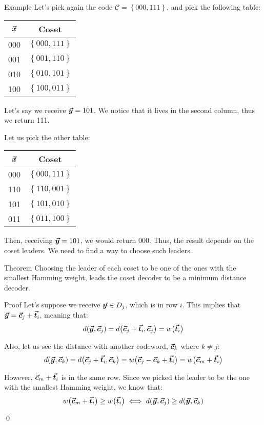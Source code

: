\documentclass[a4paper]{article}
\begin{document}
\begin{parag}{Example}
    Let's pick again the code $\mathcal{C} = \left\{000, 111\right\}$, and pick the following table:
    \begin{center}
    \begin{tabular}{c|c}
        $\bm{\protect\vec{x}}$ & Coset \\
        \hline
        000 & $\left\{000, 111\right\}$ \\
        001 & $\left\{001, 110\right\}$ \\
        010 & $\left\{010, 101\right\}$  \\
        100 & $\left\{100, 011\right\}$
    \end{tabular}
    \end{center}

    Let's say we receive $\bm{\protect\vec{y}} = 101$. We notice that it lives in the second column, thus we return 111.

    Let us pick the other table:
    \begin{center}
    \begin{tabular}{c|c}
        $\bm{\protect\vec{x}}$ & Coset \\
        \hline
        000 & $\left\{000, 111\right\}$  \\
        110 & $\left\{110, 001\right\}$ \\
        101 & $\left\{101, 010\right\}$  \\
        011 & $\left\{011, 100\right\}$
    \end{tabular}
    \end{center}

    Then, receiving $\bm{\protect\vec{y}} = 101$, we would return 000. Thus, the result depends on the coset leaders. We need to find a way to choose such leaders.
\end{parag}

\begin{parag}{Theorem}
    Choosing the leader of each coset to be one of the ones with the smallest Hamming weight, leads the coset decoder to be a minimum distance decoder. 

    \begin{subparag}{Proof}
        Let's suppose we receive $\bm{\protect\vec{y}} \in D_j$, which is in row $i$. This implies that $\bm{\protect\vec{y}} = \bm{\protect\vec{c}}_j + \bm{\protect\vec{t}}_i$, meaning that:
        \[d\left(\bvec{y}, \bvec{c}_j\right) = d\left(\bvec{c}_j + \bvec{t}_i, \bvec{c}_j\right) = w\left(\bvec{t}_i\right)\]

        Also, let us see the distance with another codeword, $\bm{\protect\vec{c}}_k$ where $k \neq j$: 
        \[d\left(\bvec{y}, \bvec{c}_k\right) = d\left(\bvec{c}_j + \bvec{t}_i, \bvec{c}_k\right) = w\left(\bvec{c}_j - \bvec{c}_k + \bvec{t}_i\right) = w\left(\bvec{c}_m + \bvec{t}_i\right)\]
        
        However, $\bm{\protect\vec{c}}_m + \bm{\protect\vec{t}}_i$ is in the same row. Since we picked the leader to be the one with the smallest Hamming weight, we know that: 
        \[w\left(\bvec{c}_m + \bvec{t}_i\right) \geq w\left(\bvec{t}_i\right) \iff d\left(\bvec{y}, \bvec{c}_j\right) \geq d\left(\bvec{y}, \bvec{c}_k\right)\]

        \qed
    \end{subparag}
\end{parag}
\end{document}
